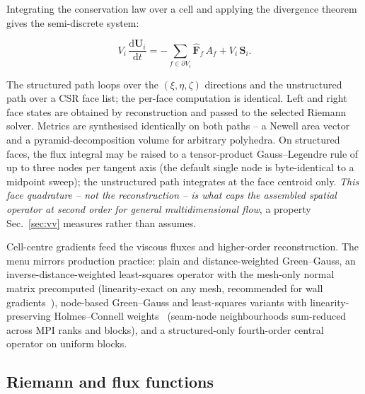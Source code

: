 \documentclass[journal,biblatex]{new-aiaa}
\newcommand{\U}{\mathbf{U}}
\begin{document}
Integrating the conservation law over a cell and applying the divergence theorem gives the semi-discrete system:

\begin{equation}
V_i\,\frac{\mathrm{d}\U_i}{\mathrm{d}t}
= -\sum_{f\in\partial V_i}\hat{\mathbf{F}}_f\,A_f + V_i\,\mathbf{S}_i.
\label{eq:semidiscrete}
\end{equation}

The structured path loops over the $(\xi,\eta,\zeta)$ directions and the unstructured path over a CSR face list; the per-face computation is identical. Left and right face states are obtained by reconstruction and passed to the selected Riemann solver. Metrics are synthesised identically on both paths -- a Newell area vector and a pyramid-decomposition volume for arbitrary polyhedra. On structured faces, the flux integral may be raised to a tensor-product Gauss--Legendre rule of up to three nodes per tangent axis (the default single node is byte-identical to a midpoint sweep); the unstructured path integrates at the face centroid only. \emph{This face quadrature -- not the reconstruction -- is what caps the assembled spatial operator at second order for general multidimensional flow}, a property Sec.~\ref{sec:vv} measures rather than assumes.

Cell-centre gradients feed the viscous fluxes and higher-order reconstruction. The menu mirrors production practice: plain and distance-weighted Green--Gauss, an inverse-distance-weighted least-squares operator with the mesh-only normal matrix precomputed (linearity-exact on any mesh, recommended for wall gradients~\cite{barth_design_1989,venkatakrishnan_application_1989,mavriplis_revisiting_2003}), node-based Green--Gauss and least-squares variants with linearity-preserving Holmes--Connell weights~\cite{holmes_solution_1989} (seam-node neighbourhoods sum-reduced across MPI ranks and blocks), and a structured-only fourth-order central operator on uniform blocks.

\subsection{Riemann and flux functions}
\end{document}
